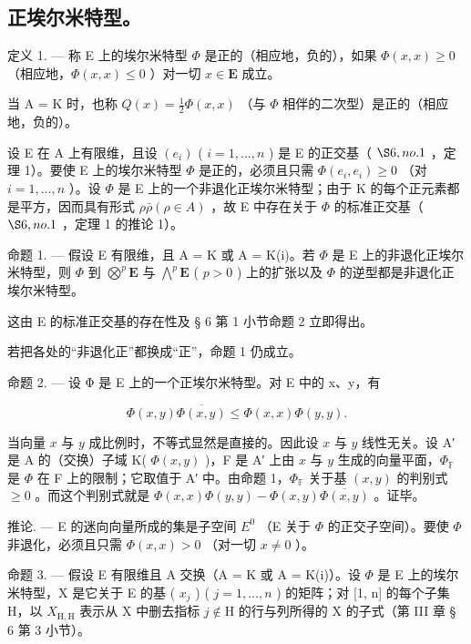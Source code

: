 \subsection{正埃尔米特型。}

定义 1. --- 称 E 上的埃尔米特型 \(\Phi\) 是正的（相应地，负的），如果 \(\Phi(x, x) \geqslant 0\) （相应地，\(\Phi(x, x) \leqslant 0\) ）对一切 \(x \in \mathbf{E}\) 成立。

当 A = K 时，也称 \(Q(x) = \frac{1}{2} \Phi(x, x)\) （与 \(\Phi\) 相伴的二次型）是正的（相应地，负的）。

设 E 在 A 上有限维，且设 \((e_{i})\) ( \(i = 1, \ldots, n\) ) 是 E 的正交基（ \(\S 6, no. 1\) ，定理 1）。要使 E 上的埃尔米特型 \(\Phi\) 是正的，必须且只需 \(\Phi(e_{i}, e_{i}) \geqslant 0\) （对 \(i = 1, \ldots, n\) ）。设 \(\Phi\) 是 E 上的一个非退化正埃尔米特型；由于 K 的每个正元素都是平方，因而具有形式 \(\rho\bar{\rho} (\rho \in A)\) ，故 E 中存在关于 \(\Phi\) 的标准正交基（ \(\S 6, no. 1\) ，定理 1 的推论 1）。

命题 1. --- 假设 E 有限维，且 A = K 或 A = K(i)。若 \(\Phi\) 是 E 上的非退化正埃尔米特型，则 \(\Phi\) 到 \(\bigotimes^{p}\mathbf{E}\) 与 \(\bigwedge^{p}\mathbf{E}\) ( \(p > 0\) ) 上的扩张以及 \(\Phi\) 的逆型都是非退化正埃尔米特型。

这由 E 的标准正交基的存在性及 § 6 第 1 小节命题 2 立即得出。

若把各处的“非退化正”都换成“正”，命题 1 仍成立。

命题 2. --- 设 Φ 是 E 上的一个正埃尔米特型。对 E 中的 x、y，有

\[
\Phi (x, y) \overline {{{{\Phi (x , y)}}}} \leqslant \Phi (x, x) \Phi (y, y).\tag{1}
\]

当向量 \(x\) 与 \(y\) 成比例时，不等式显然是直接的。因此设 \(x\) 与 \(y\) 线性无关。设 A′ 是 A 的（交换）子域 K( \(\Phi(x, y)\) )，F 是 A′ 上由 \(x\) 与 \(y\) 生成的向量平面，\(\Phi_{\mathbb{F}}\) 是 \(\Phi\) 在 F 上的限制；它取值于 A′ 中。由命题 1，\(\Phi_{\mathbb{F}}\) 关于基 \((x, y)\) 的判别式 \(\geqslant 0\) 。而这个判别式就是 \(\Phi(x, x)\Phi(y, y) - \Phi(x, y)\overline{\Phi(x, y)}\) 。证毕。

推论. --- E 的迷向向量所成的集是子空间 \(E^{0}\) （E 关于 \(\Phi\) 的正交子空间）。要使 \(\Phi\) 非退化，必须且只需 \(\Phi(x, x) > 0\) （对一切 \(x \neq 0\) ）。

命题 3. --- 假设 E 有限维且 A 交换（A = K 或 A = K(i)）。设 \(\Phi\) 是 E 上的埃尔米特型，X 是它关于 E 的基 ( \(x_j\) ) ( \(j = 1, \ldots, n\) ) 的矩阵；对 {[}1, n{]} 的每个子集 H，以 \(X_{\mathrm{H,H}}\) 表示从 X 中删去指标 \(j \notin \mathrm{H}\) 的行与列所得的 X 的子式（第 III 章 § 6 第 3 小节）。

